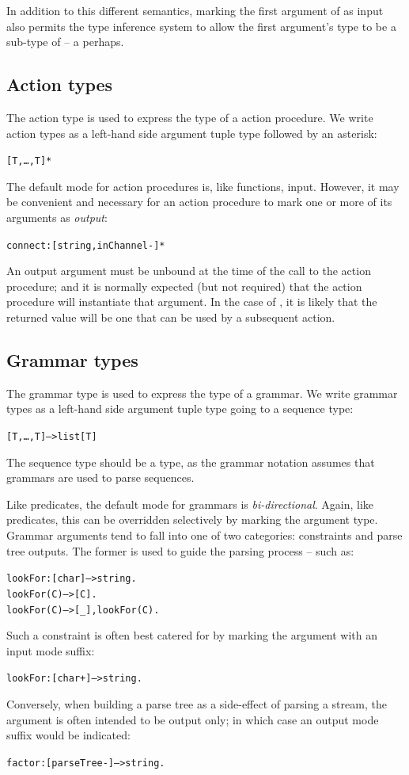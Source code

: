In addition to this different semantics, marking the first argument of  as input also permits the type inference system to allow the first argument's type to be a sub-type of  -- a  perhaps.

\subsection{Action types}
\label{types:action}
The action type is used to express the type of a action procedure. We write action types as a left-hand side argument tuple type followed by an asterisk:
\begin{alltt}
[T,\ldots,T\subn]*
\end{alltt}

The default mode for action procedures is, like functions, input. However, it may be convenient and necessary for an action procedure to mark one or more of its arguments as \emph{output}:
\begin{alltt}
connect:[string,inChannel-]*
\end{alltt}
An output argument must be unbound at the time of the call to the action procedure; and it is normally expected (but not required) that the action procedure will instantiate that argument. In the case of , it is likely that the returned value will be one that can be used by a subsequent action.

\subsection{Grammar types}
\label{types:grammar}
The grammar type is used to express the type of a grammar. We write grammar types as a left-hand side argument tuple type going to a sequence type:
\begin{alltt}
[T,\ldots,T\subn]-->list[T]
\end{alltt}
The sequence type should be a  type, as the grammar notation assumes that grammars are used to parse sequences.

Like predicates, the default mode for grammars is \emph{bi-directional}. Again, like predicates, this can be overridden selectively by marking the argument type. Grammar arguments tend to fall into one of two categories: constraints and parse tree outputs. The former is used to guide the parsing process -- such as:
\begin{alltt}
lookFor:[char] --> string.
lookFor(C) --> [C].
lookFor(C) --> [_], lookFor(C).
\end{alltt}
Such a constraint is often best catered for by marking the argument with an input mode suffix:
\begin{alltt}
lookFor:[char+] --> string.
\end{alltt}
Conversely, when building a parse tree as a side-effect of parsing a stream, the argument is often intended to be output only; in which case an output mode suffix would be indicated:
\begin{alltt}
factor:[parseTree-]-->string.
\end{alltt}

